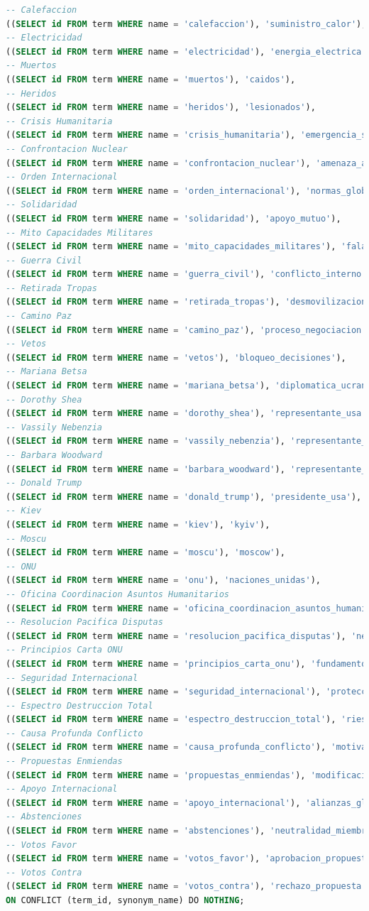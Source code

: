 \documentclass[twoside]{article}
\begin{document}
\begin{lstlisting}[language=SQL,caption={Inserting Synonyms},label={lst:insertsynonyms}]
-- Calefaccion
((SELECT id FROM term WHERE name = 'calefaccion'), 'suministro_calor'),
-- Electricidad
((SELECT id FROM term WHERE name = 'electricidad'), 'energia_electrica'),
-- Muertos
((SELECT id FROM term WHERE name = 'muertos'), 'caidos'),
-- Heridos
((SELECT id FROM term WHERE name = 'heridos'), 'lesionados'),
-- Crisis Humanitaria
((SELECT id FROM term WHERE name = 'crisis_humanitaria'), 'emergencia_social'),
-- Confrontacion Nuclear
((SELECT id FROM term WHERE name = 'confrontacion_nuclear'), 'amenaza_atomic'),
-- Orden Internacional
((SELECT id FROM term WHERE name = 'orden_internacional'), 'normas_globales'),
-- Solidaridad
((SELECT id FROM term WHERE name = 'solidaridad'), 'apoyo_mutuo'),
-- Mito Capacidades Militares
((SELECT id FROM term WHERE name = 'mito_capacidades_militares'), 'falacia_potencia_rusa'),
-- Guerra Civil
((SELECT id FROM term WHERE name = 'guerra_civil'), 'conflicto_interno'),
-- Retirada Tropas
((SELECT id FROM term WHERE name = 'retirada_tropas'), 'desmovilizacion_militar'),
-- Camino Paz
((SELECT id FROM term WHERE name = 'camino_paz'), 'proceso_negociacion'),
-- Vetos
((SELECT id FROM term WHERE name = 'vetos'), 'bloqueo_decisiones'),
-- Mariana Betsa
((SELECT id FROM term WHERE name = 'mariana_betsa'), 'diplomatica_ucraniana'),
-- Dorothy Shea
((SELECT id FROM term WHERE name = 'dorothy_shea'), 'representante_usa'),
-- Vassily Nebenzia
((SELECT id FROM term WHERE name = 'vassily_nebenzia'), 'representante_ruso'),
-- Barbara Woodward
((SELECT id FROM term WHERE name = 'barbara_woodward'), 'representante_reino_unido'),
-- Donald Trump
((SELECT id FROM term WHERE name = 'donald_trump'), 'presidente_usa'),
-- Kiev
((SELECT id FROM term WHERE name = 'kiev'), 'kyiv'),
-- Moscu
((SELECT id FROM term WHERE name = 'moscu'), 'moscow'),
-- ONU
((SELECT id FROM term WHERE name = 'onu'), 'naciones_unidas'),
-- Oficina Coordinacion Asuntos Humanitarios
((SELECT id FROM term WHERE name = 'oficina_coordinacion_asuntos_humanitarios'), 'ocha'),
-- Resolucion Pacifica Disputas
((SELECT id FROM term WHERE name = 'resolucion_pacifica_disputas'), 'negociacion_conflictos'),
-- Principios Carta ONU
((SELECT id FROM term WHERE name = 'principios_carta_onu'), 'fundamentos_internacionales'),
-- Seguridad Internacional
((SELECT id FROM term WHERE name = 'seguridad_internacional'), 'proteccion_global'),
-- Espectro Destruccion Total
((SELECT id FROM term WHERE name = 'espectro_destruccion_total'), 'riesgo_extincion_masiva'),
-- Causa Profunda Conflicto
((SELECT id FROM term WHERE name = 'causa_profunda_conflicto'), 'motivaciones_politicas'),
-- Propuestas Enmiendas
((SELECT id FROM term WHERE name = 'propuestas_enmiendas'), 'modificaciones_texto'),
-- Apoyo Internacional
((SELECT id FROM term WHERE name = 'apoyo_internacional'), 'alianzas_globales'),
-- Abstenciones
((SELECT id FROM term WHERE name = 'abstenciones'), 'neutralidad_miembros'),
-- Votos Favor
((SELECT id FROM term WHERE name = 'votos_favor'), 'aprobacion_propuesta'),
-- Votos Contra
((SELECT id FROM term WHERE name = 'votos_contra'), 'rechazo_propuesta')
ON CONFLICT (term_id, synonym_name) DO NOTHING;
\end{lstlisting}
\end{document}
